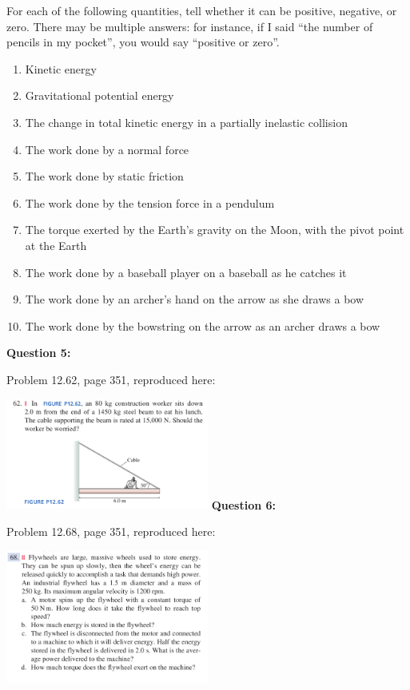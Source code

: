 \documentclass[12pt]{article}
\begin{document}
For each of the following quantities, tell whether it can be positive, negative, or zero. There may be multiple answers: for instance, if I said ``the number of pencils in my pocket'', you would say ``positive or zero''.

\begin{enumerate}
  \item{Kinetic energy}
  \item{Gravitational potential energy}
  \item{The change in total kinetic energy in a partially inelastic collision}
  \item{The work done by a normal force}
  \item{The work done by static friction}
  \item{The work done by the tension force in a pendulum}
  \item{The torque exerted by the Earth's gravity on the Moon, with the pivot point at the Earth}
  \item{The work done by a baseball player on a baseball as he catches it}
  \item{The work done by an archer's hand on the arrow as she draws a bow}
  \item{The work done by the bowstring on the arrow as an archer draws a bow}
\end{enumerate}

{\bf Question 5:}

Problem 12.62, page 351, reproduced here:

\includegraphics[width=0.5\textwidth]{torque1.png}
\newpage
{\bf Question 6:}

Problem 12.68, page 351, reproduced here:

\includegraphics[width=0.5\textwidth]{kinematics1.png}
\end{document}
